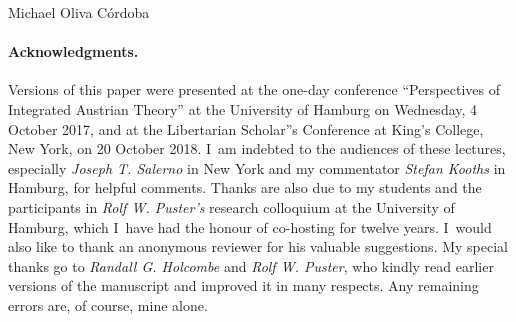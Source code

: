 \begin{artengenv}{Michael Oliva Córdoba}
\paragraph{Acknowledgments.}
Versions of this paper were presented at the one-day conference ``Perspectives of Integrated Austrian Theory'' at the University of Hamburg on Wednesday, 4 October 2017, and at the Libertarian Scholar''s Conference at King's College, New York, on 20 October 2018. I~am indebted to the audiences of these lectures, especially \textit{Joseph T. Salerno} in New York and my commentator \textit{Stefan Kooths} in Hamburg, for helpful comments. Thanks are also due to my students and the participants in \textit{Rolf W. Puster's} research colloquium at the University of Hamburg, which I~have had the honour of co-hosting for twelve years. I~would also like to thank an anonymous reviewer for his valuable suggestions. My special thanks go to \textit{Randall G. Holcombe} and \textit{Rolf W. Puster}, who kindly read earlier versions of the manuscript and improved it in many respects. Any remaining errors are, of course, mine alone.




\end{artengenv}

\label{oliva-lastpage}